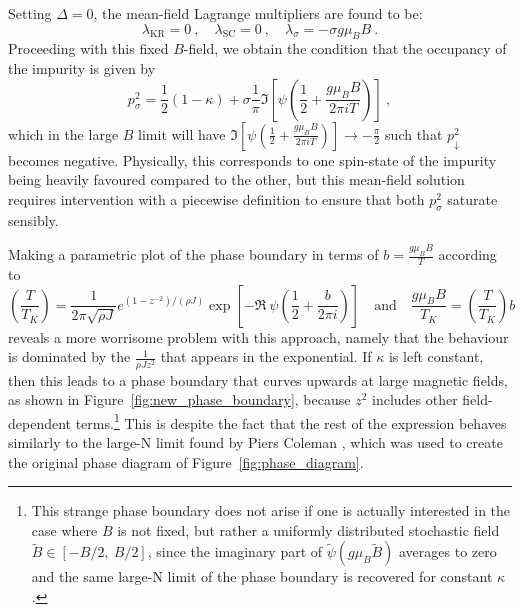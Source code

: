 Setting $ \Delta = 0 $, the mean-field Lagrange multipliers are found to be:
\begin{equation}
\lambda_{\text{KR}} = 0 ~, \quad \lambda_{\text{SC}} = 0 ~,
\quad \lambda_{\sigma} = - \sigma g \mu_{B} B ~.
\end{equation}
Proceeding with this fixed $ B $-field, we obtain the condition that the occupancy of the impurity is given by
\begin{equation}
p^2_{\sigma} = \frac{1}{2} ( 1 - \kappa ) + \sigma \frac{1}{\pi} \Im{\left[ \psi\left( \frac{1}{2} + \frac{g \mu_B B}{2 \pi i T} \right) \right]} ~,
\end{equation}
which in the large $ B $ limit will have $ \Im{\left[ \psi\left( \frac{1}{2} + \frac{g \mu_B B}{2 \pi i T} \right) \right]} \rightarrow - \frac{\pi}{2} $ such that $ p^2_{\downarrow} $ becomes negative. Physically, this corresponds to one spin-state of the impurity being heavily favoured compared to the other, but this mean-field solution requires intervention with a piecewise definition to ensure that both $ p^2_{\sigma} $ saturate sensibly.

Making a parametric plot of the phase boundary in terms of $ b = \frac{g \mu_B B}{T} $ according to
\begin{equation}
\left( \frac{T}{T_K} \right) = \frac{1}{2 \pi \sqrt{\rho J}} e^{\left( 1 - z^{-2} \right) / (\rho J)} \exp{\left[ - \Re ~ \psi \left( \frac{1}{2} + \frac{b}{2 \pi i} \right) \right]} \quad \text{and} \quad \frac{g \mu_B B}{T_K} = \left( \frac{T}{T_K} \right) b
\label{eq:phase_parametric}
\end{equation}
reveals a more worrisome problem with this approach, namely that the behaviour is dominated by the $ \frac{1}{\rho J z^2} $ that appears in the exponential. If $ \kappa $ is left constant, then this leads to a phase boundary that curves upwards at large magnetic fields, as shown in Figure~\ref{fig:new_phase_boundary}, because $ z^2 $ includes other field-dependent terms.\footnote{This strange phase boundary does not arise if one is actually interested in the case where $ B $ is not fixed, but rather a uniformly distributed stochastic field $ \widetilde{B} \in [ - B / 2, ~ B / 2 ] $, since the imaginary part of $ \widetilde{\psi} (g \mu_B \widetilde{B}) $ averages to zero and the same large-N limit of the phase boundary is recovered for constant $ \kappa $.} This is despite the fact that the rest of the expression behaves similarly to the large-N limit found by Piers Coleman \cite{ManyBodyPhysics}, which was used to create the original phase diagram of Figure~\ref{fig:phase_diagram}.

